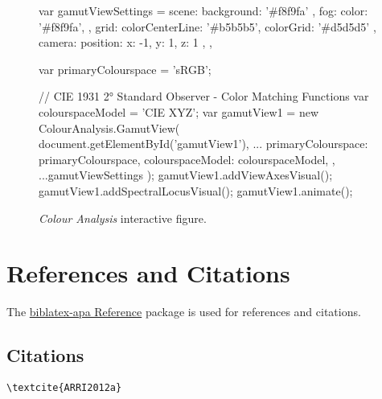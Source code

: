 \begin{figure}[H]
    \ifdefined\HCode
        \JavaScript
            var gamutViewSettings = {
                    scene: {
                        background: '#f8f9fa'
                    },
                    fog: {
                        color: '#f8f9fa',
                    },
                    grid: {
                        colorCenterLine: '#b5b5b5',
                        colorGrid: '#d5d5d5'
                    },
                    camera: {
                        position: { x: -1, y: 1, z: 1 },
                    },
            }

            var primaryColourspace = 'sRGB';

            // CIE 1931 2° Standard Observer - Color Matching Functions
            var colourspaceModel = 'CIE XYZ';
            var gamutView1 = new ColourAnalysis.GamutView(
                document.getElementById('gamutView1'),
                {
                    ...{
                        primaryColourspace: primaryColourspace,
                        colourspaceModel: colourspaceModel,
                    },
                    ...gamutViewSettings
                }
            );
            gamutView1.addViewAxesVisual();
            gamutView1.addSpectralLocusVisual();
            gamutView1.animate();
        \EndJavaScript
    \fi
    \caption{
        \textit{Colour Analysis} interactive figure.
    }
    \label{fig:colour-analysis-interactive-figure}
\end{figure}

\section*{References and Citations}%
\label{sec:references-and-citations}

The \href{https://ctan.org/pkg/biblatex-apa}{biblatex-apa Reference}
package is used for references and citations.

\subsection*{Citations}%
\label{subsec:citations}

\begin{lstlisting}[caption={Citation for Single Author.}]
\textcite{ARRI2012a}
\end{lstlisting}

\textcite{ARRI2012a}

